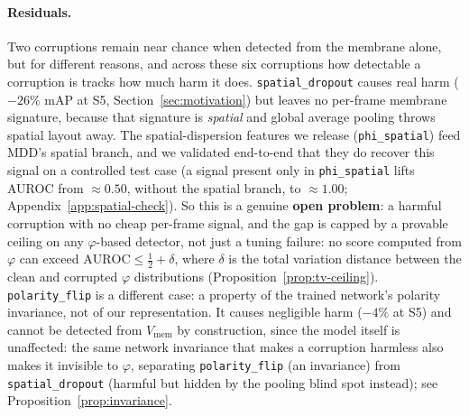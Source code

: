 ﻿\documentclass{article} %
\theoremstyle{remark}
\begin{document}
\paragraph{Residuals.}
Two corruptions remain near chance when detected from the membrane alone, but for different reasons,
and across these six corruptions how detectable a corruption is tracks how much harm it does.
\texttt{spatial\_dropout} causes real harm ($-26\%$ mAP at S5, Section~\ref{sec:motivation}) but
leaves no per-frame membrane signature, because that signature is \emph{spatial} and global average
pooling throws spatial layout away. The spatial-dispersion features we release
(\texttt{phi\_spatial}) feed MDD's spatial branch, and we validated end-to-end that they do recover
this signal on a controlled test case (a signal present only in \texttt{phi\_spatial} lifts AUROC
from $\approx0.50$, without the spatial branch, to $\approx1.00$; Appendix~\ref{app:spatial-check}).
So this is a genuine \textbf{open problem}: a harmful corruption with no cheap per-frame signal, and
the gap is capped by a provable ceiling on any $\varphi$-based detector, not just a tuning failure:
no score computed from $\varphi$ can exceed $\mathrm{AUROC}\le\tfrac12+\delta$, where $\delta$ is the
total variation distance between the clean and corrupted $\varphi$ distributions
(Proposition~\ref{prop:tv-ceiling}). \texttt{polarity\_flip} is a different case: a property of the
trained network's polarity invariance, not of our representation. It causes negligible harm
($-4\%$ at S5) and cannot be detected from $V_{\mathrm{mem}}$ by construction, since the model itself
is unaffected: the same network invariance that makes a corruption harmless also makes it
invisible to $\varphi$, separating \texttt{polarity\_flip} (an invariance) from
\texttt{spatial\_dropout} (harmful but hidden by the pooling blind spot instead); see
Proposition~\ref{prop:invariance}.
\end{document}
